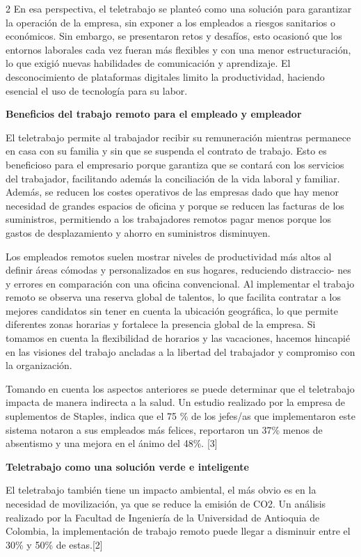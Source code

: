 \documentclass[12pt,spanish,Letterpaper,openany]{book}
\begin{document}
\begin {multicols}{2}
En esa perspectiva, el teletrabajo se planteó como una solución para garantizar la operación de la
empresa, sin exponer a los empleados a riesgos sanitarios o económicos. Sin embargo, se
presentaron retos y desafíos, esto ocasionó que los entornos laborales cada vez fueran más flexibles
y con una menor estructuración, lo que exigió nuevas habilidades de comunicación y aprendizaje.
El desconocimiento de plataformas digitales limito la productividad, haciendo esencial el uso de
tecnología para su labor.

\textbf{Beneficios del trabajo remoto para el empleado y empleador}

El teletrabajo permite al trabajador recibir su remuneración mientras permanece en casa con su
familia y sin que se suspenda el contrato de trabajo. Esto es beneficioso para el empresario porque
garantiza que se contará con los servicios del trabajador, facilitando además la conciliación de la
vida laboral y familiar. Además, se reducen los costes operativos de las empresas dado que hay
menor necesidad de grandes espacios de oficina y porque se reducen las facturas de los suministros,
permitiendo a los trabajadores remotos pagar menos porque los gastos de desplazamiento y ahorro
en suministros disminuyen.

Los empleados remotos suelen mostrar niveles de productividad más altos al definir áreas cómodas
y personalizados en sus hogares, reduciendo distraccio-
nes y errores en comparación con una
oficina convencional. Al implementar el trabajo remoto se observa una reserva global de talentos,
lo que facilita contratar a los mejores candidatos sin tener en cuenta la ubicación geográfica, lo
que permite diferentes zonas horarias y fortalece la presencia global de la empresa. Si tomamos en
cuenta la flexibilidad de horarios y las vacaciones, hacemos hincapié en las visiones del trabajo
ancladas a la libertad del trabajador y compromiso con la organización.

Tomando en cuenta los aspectos anteriores se puede determinar que el teletrabajo impacta de
manera indirecta a la salud. Un estudio realizado por la empresa de suplementos de Staples, indica
que el 75 \% de los jefes/as que implementaron este sistema notaron a sus empleados más felices,
reportaron un 37\% menos de absentismo y una mejora en el ánimo del 48\%.
{[}3{]}

\textbf{Teletrabajo como una solución verde e inteligente}

El teletrabajo también tiene un impacto ambiental, el más obvio es en la necesidad de movilización,
ya que se reduce la emisión de CO2. Un análisis realizado por la Facultad de Ingeniería de la
Universidad de Antioquia de Colombia, la implementación de trabajo remoto puede llegar a
disminuir entre el 30\% y 50\% de estas.{[}2{]}


\end{multicols}
\end{document}
